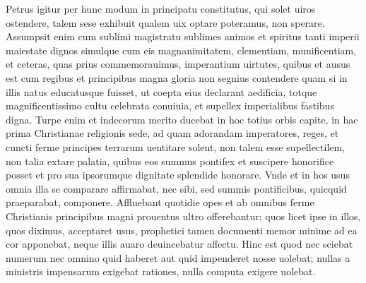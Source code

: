\documentclass[a5paper,twoside]{article}
\begin{document}
Petrus igitur per hunc modum in principatu constitutus, qui solet uiros ostendere, talem sese exhibuit qualem uix optare poteramus, non sperare. Assumpsit enim cum sublimi magistratu sublimes animos et spiritus tanti imperii maiestate dignos simulque cum eis magnanimitatem, clementiam, munificentiam, et ceteras, quas prius commemorauimus, imperantium uirtutes, quibus et ausus est cum regibus et principibus magna gloria non segnius contendere quam si in illis natus educatusque fuisset, ut coepta eius declarant aedificia, totque magnificentissimo cultu celebrata conuiuia, et supellex imperialibus fastibus digna. Turpe enim et indecorum merito ducebat in hoc totius orbis capite, in hac prima Christianae religionis sede, ad quam adorandam imperatores, reges, et cuncti ferme principes terrarum uentitare solent, non talem esse supellectilem, non talia extare palatia, quibus eos summus pontifex et suscipere honorifice posset et pro sua ipsorumque dignitate splendide honorare. Vnde et in hos usus omnia illa se comparare affirmabat, nec sibi, sed summis pontificibus, quicquid praeparabat, componere. Affluebant quotidie opes et ab omnibus ferme Christianis principibus magni prouentus ultro offerebantur; quos licet ipse in illos, quos diximus, acceptaret usus, prophetici tamen documenti memor minime ad ea cor apponebat, neque illis auaro deuincebatur affectu. Hinc est quod nec sciebat numerum nec omnino quid haberet aut quid impenderet nosse uolebat; nullas a ministris impensarum exigebat rationes, nulla computa exigere uolebat.


\endnumbering
\end{document}
